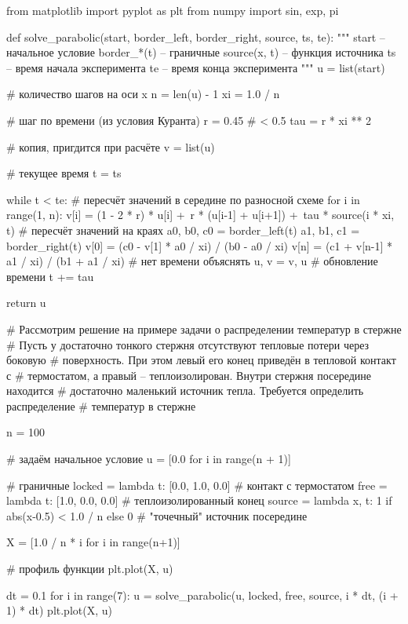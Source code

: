 {%
from matplotlib import pyplot as plt
from numpy import sin, exp, pi


def solve_parabolic(start, border_left, border_right, source, ts, te):
    """
    start -- начальное условие
    border_*(t) -- граничные
    source(x, t) -- функция источника
    ts -- время начала эксперимента
    te -- время конца эксперимента
    """
    u = list(start)

    # количество шагов на оси x
    n = len(u) - 1
    xi = 1.0 / n

    # шаг по времени (из условия Куранта)
    r = 0.45 # < 0.5
    tau = r * xi ** 2

    # копия, пригдится при расчёте
    v = list(u)

    # текущее время
    t = ts

    while t < te:
        # пересчёт значений в середине по разносной схеме
        for i in range(1, n):
            v[i] = (1 - 2 * r) * u[i] +\
                    r * (u[i-1] + u[i+1]) +\
                    tau * source(i * xi, t)
        # пересчёт значений на краях
        a0, b0, c0 = border_left(t)
        a1, b1, c1 = border_right(t)
        v[0] = (c0 - v[1] * a0 / xi) / (b0 - a0 / xi)
        v[n] = (c1 + v[n-1] * a1 / xi) / (b1 + a1 / xi)
        # нет времени объяснять
        u, v = v, u
        # обновление времени
        t += tau

    return u

# Рассмотрим решение на примере задачи о распределении температур в стержне
# Пусть у достаточно тонкого стержня отсутствуют тепловые потери через боковую
# поверхность. При этом левый его конец приведён в тепловой контакт с
# термостатом, а правый -- теплоизолирован. Внутри стержня посередине находится
# достаточно маленький источник тепла. Требуется определить распределение
# температур в стержне

n = 100

# задаём начальное условие
u = [0.0 for i in range(n + 1)]

# граничные
locked = lambda t: [0.0, 1.0, 0.0]           # контакт с термостатом
free =   lambda t: [1.0, 0.0, 0.0]           # теплоизолированный конец
source = lambda x, t: 1 if abs(x-0.5) < 1.0 / n else 0  # "точечный" источник посередине

X = [1.0 / n * i for i in range(n+1)]

# профиль функции
plt.plot(X, u)

dt = 0.1
for i in range(7):
    u = solve_parabolic(u, locked, free, source, i * dt, (i + 1) * dt)
    plt.plot(X, u)

}
